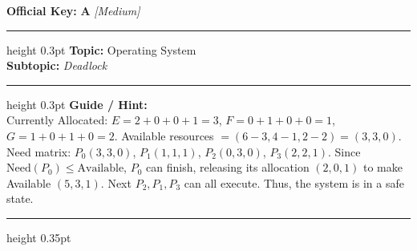 \documentclass[a4paper,10pt]{article}
\begin{document}
\begin{tcolorbox}
\textbf{Official Key:} \textbf{\large A} \hfill \textit{\small [Medium]}
\vspace{2pt}\hrule height 0.3pt\vspace{3pt}
\textbf{Topic:} Operating System \\
\textbf{Subtopic:} \textit{Deadlock}
\vspace{2pt}\hrule height 0.3pt\vspace{3pt}
\textbf{Guide / Hint:} \\
{\small Currently Allocated: $E = 2+0+0+1 = 3$, $F = 0+1+0+0 = 1$, $G = 1+0+1+0 = 2$. Available resources $= (6-3, 4-1, 2-2) = (3, 3, 0)$. Need matrix: $P_0(3, 3, 0)$, $P_1(1, 1, 1)$, $P_2(0, 3, 0)$, $P_3(2, 2, 1)$. Since $\text{Need}(P_0) \le \text{Available}$, $P_0$ can finish, releasing its allocation $(2, 0, 1)$ to make Available $(5, 3, 1)$. Next $P_2, P_1, P_3$ can all execute. Thus, the system is in a safe state.}

\end{tcolorbox}
\vspace{6pt}\hrule height 0.35pt\vspace{6pt}
\noindent
\end{document}
